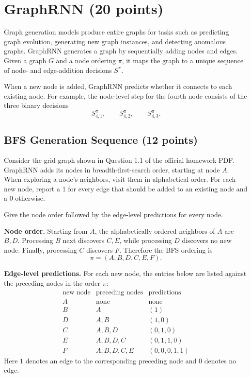 \section{GraphRNN (20 points)}

Graph generation models produce entire graphs for tasks such as predicting
graph evolution, generating new graph instances, and detecting anomalous
graphs. GraphRNN generates a graph by sequentially adding nodes and edges.
Given a graph \(G\) and a node ordering \(\pi\), it maps the graph to a unique
sequence of node- and edge-addition decisions \(S^\pi\).

When a new node is added, GraphRNN predicts whether it connects to each
existing node. For example, the node-level step for the fourth node consists
of the three binary decisions
\[
  S_{4,1}^{\pi},\qquad S_{4,2}^{\pi},\qquad S_{4,3}^{\pi}.
\]

\subsection{BFS Generation Sequence (12 points)}

Consider the grid graph shown in Question 1.1 of the official homework PDF.
GraphRNN adds its nodes in breadth-first-search order, starting at node \(A\).
When exploring a node's neighbors, visit them in alphabetical order. For each
new node, report a \(1\) for every edge that should be added to an existing
node and a \(0\) otherwise.

Give the node order followed by the edge-level predictions for every node.

\begin{solution}
\textbf{Node order.}
Starting from \(A\), the alphabetically ordered neighbors of \(A\) are
\(B,D\).  Processing \(B\) next discovers \(C,E\), while processing \(D\)
discovers no new node.  Finally, processing \(C\) discovers \(F\).  Therefore
the BFS ordering is
\[
  \pi=(A,B,D,C,E,F).
\]

\textbf{Edge-level predictions.}
For each new node, the entries below are listed against the preceding nodes
in the order \(\pi\):
\[
\begin{array}{c|c|c}
\text{new node} & \text{preceding nodes} & \text{predictions} \\ \hline
A & \text{none} & \text{none} \\
B & A & (1) \\
D & A,B & (1,0) \\
C & A,B,D & (0,1,0) \\
E & A,B,D,C & (0,1,1,0) \\
F & A,B,D,C,E & (0,0,0,1,1)
\end{array}
\]
Here \(1\) denotes an edge to the corresponding preceding node and \(0\)
denotes no edge.
\end{solution}

